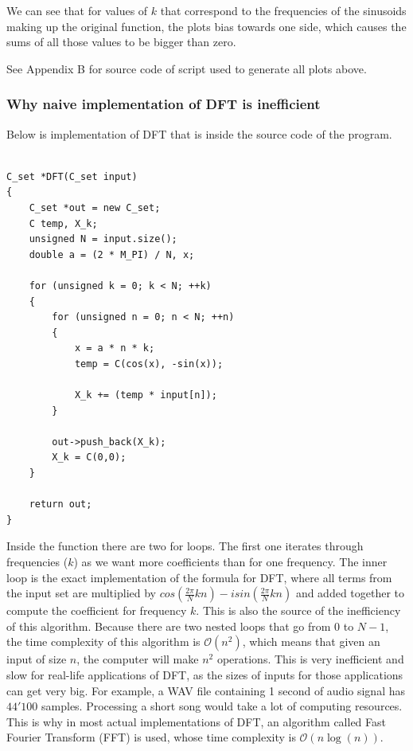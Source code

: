 \documentclass[titlepage]{article}
\begin{document}
    We can see that for values of $k$ that correspond to the frequencies of the
    sinusoids making up the original function, the plots bias towards one side,
    which causes the sums of all those values to be bigger than zero.
    
    See Appendix B for source code of script used to generate all plots above.

\subsubsection{Why naive implementation of DFT is inefficient}

    Below is implementation of DFT that is inside the source code of the program.

    \begin{verbatim}

C_set *DFT(C_set input)
{
    C_set *out = new C_set;
    C temp, X_k;
    unsigned N = input.size();
    double a = (2 * M_PI) / N, x;

    for (unsigned k = 0; k < N; ++k)
    {
        for (unsigned n = 0; n < N; ++n)
        {
            x = a * n * k;
            temp = C(cos(x), -sin(x));

            X_k += (temp * input[n]);
        }

        out->push_back(X_k);
        X_k = C(0,0);
    }

    return out;
}
    \end{verbatim}

    Inside the function there are two for loops. The first one iterates through
    frequencies ($k$) as we want more coefficients than for one frequency. The 
    inner loop is the exact implementation of the formula for DFT, where all terms
    from the input set are multiplied by $cos\left(\frac{2\pi}{N}kn\right) - isin\left( 
    \frac{2\pi}{N}kn\right)$ and added together to compute the coefficient for 
    frequency $k$. This is also the source of the inefficiency of this algorithm.
    Because there are two nested loops that go from $0$ to $N-1$, the time complexity
    of this algorithm is $\mathcal{O}(n^2)$, which means that given an input of 
    size $n$, the computer will make $n^2$ operations. This is very inefficient
    and slow for real-life applications of DFT, as the sizes of inputs for those
    applications can get very big. For example, a WAV file containing 1 second of
    audio signal has $44'100$ samples. Processing a short song would take a lot
    of computing resources. This is why in most actual implementations of DFT,
    an algorithm called Fast Fourier Transform (FFT) is used, whose time complexity
    is $\mathcal{O}(n\log(n))$.
\end{document}
